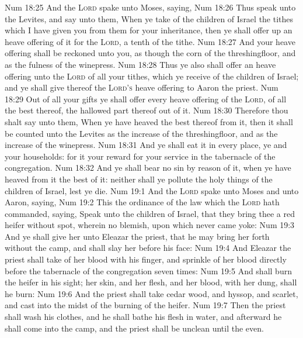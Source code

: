 \vs Num 18:25 And the \textsc{Lord} spake unto Moses, saying,
\vs Num 18:26 Thus speak unto the Levites, and say unto them, When ye take of the children of Israel the tithes which I have given you from them for your inheritance, then ye shall offer up an heave offering of it for the \textsc{Lord},  a tenth  of the tithe.
\vs Num 18:27 And  your heave offering shall be reckoned unto you, as though  the corn of the threshingfloor, and as the fulness of the winepress.
\vs Num 18:28 Thus ye also shall offer an heave offering unto the \textsc{Lord} of all your tithes, which ye receive of the children of Israel; and ye shall give thereof the \textsc{Lord's} heave offering to Aaron the priest.
\vs Num 18:29 Out of all your gifts ye shall offer every heave offering of the \textsc{Lord}, of all the best thereof,  the hallowed part thereof out of it.
\vs Num 18:30 Therefore thou shalt say unto them, When ye have heaved the best thereof from it, then it shall be counted unto the Levites as the increase of the threshingfloor, and as the increase of the winepress.
\vs Num 18:31 And ye shall eat it in every place, ye and your households: for it  your reward for your service in the tabernacle of the congregation.
\vs Num 18:32 And ye shall bear no sin by reason of it, when ye have heaved from it the best of it: neither shall ye pollute the holy things of the children of Israel, lest ye die.
\vs Num 19:1 And the \textsc{Lord} spake unto Moses and unto Aaron, saying,
\vs Num 19:2 This  the ordinance of the law which the \textsc{Lord} hath commanded, saying, Speak unto the children of Israel, that they bring thee a red heifer without spot, wherein  no blemish,  upon which never came yoke:
\vs Num 19:3 And ye shall give her unto Eleazar the priest, that he may bring her forth without the camp, and  shall slay her before his face:
\vs Num 19:4 And Eleazar the priest shall take of her blood with his finger, and sprinkle of her blood directly before the tabernacle of the congregation seven times:
\vs Num 19:5 And  shall burn the heifer in his sight; her skin, and her flesh, and her blood, with her dung, shall he burn:
\vs Num 19:6 And the priest shall take cedar wood, and hyssop, and scarlet, and cast  into the midst of the burning of the heifer.
\vs Num 19:7 Then the priest shall wash his clothes, and he shall bathe his flesh in water, and afterward he shall come into the camp, and the priest shall be unclean until the even.
